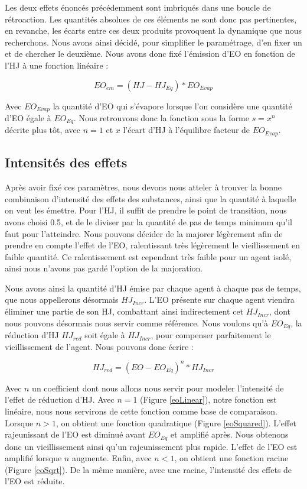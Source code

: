 	Les deux effets énoncés précédemment sont imbriqués dans une boucle de rétroaction. Les quantités absolues de ces éléments ne sont donc pas pertinentes, en revanche, les écarts entre ces deux produits provoquent la dynamique que nous recherchons. Nous avons ainsi décidé, pour simplifier le paramétrage, d'en fixer un et de chercher le deuxième. Nous avons donc fixé l'émission d'EO en fonction de l'HJ à une fonction linéaire :
	
	\begin{equation}
		EO_{em} = (HJ - HJ_{Eq}) * EO_{Evap}
	\label{eoEM}
	\end{equation}

Avec $EO_{Evap}$ la quantité d'EO qui s'évapore lorsque l'on considère une quantité d'EO égale à $EO_{Eq}$. Nous retrouvons donc la fonction sous la forme $s=x^n$ décrite plus tôt, avec $n = 1$ et $x$ l'écart d'HJ à l'équilibre facteur de $EO_{Evap}$.
	
	
	\subsection{Intensités des effets}	
	Après avoir fixé ces paramètres, nous devons nous atteler à trouver la bonne combinaison d'intensité des effets des substances, ainsi que la quantité à laquelle on veut les émettre. Pour l'HJ, il suffit de prendre le point de transition, nous avons choisi 0.5, et de le diviser par la quantité de pas de temps minimum qu'il faut pour l'atteindre. Nous pouvons décider de la majorer légèrement afin de prendre en compte l'effet de l'EO, ralentissant très légèrement le vieillissement en faible quantité. Ce ralentissement est cependant très faible pour un agent isolé, ainsi nous n'avons pas gardé l'option de la majoration.
	
	Nous avons ainsi la quantité d'HJ émise par chaque agent à chaque pas de temps, que nous appellerons désormais $HJ_{Incr}$. L'EO présente sur chaque agent viendra éliminer une partie de son HJ, combattant ainsi indirectement cet $HJ_{Incr}$, dont nous pouvons désormais nous servir comme référence. Nous voulons qu'à $EO_{Eq}$, la réduction d'HJ $HJ_{red}$ soit égale à $HJ_{Incr}$, pour compenser parfaitement le vieillissement de l'agent. Nous pouvons donc écrire :
	
	\begin{equation}
		 HJ_{red} = (EO - EO_{Eq})^n * HJ_{Incr}
	\label{hjRED}
	\end{equation}
	
	Avec $n$ un coefficient dont nous allons nous servir pour modeler l'intensité de l'effet de réduction d'HJ. Avec $n=1$ (Figure \ref{eoLinear}), notre fonction est linéaire, nous nous servirons de cette fonction comme base de comparaison. Lorsque $n>1$, on obtient une fonction quadratique (Figure \ref{eoSquared}). L'effet rajeunissant de l'EO est diminué avant $EO_{Eq}$ et amplifié après. Nous obtenons donc un vieillissement ainsi qu'un rajeunissement plus rapide. L'effet de l'EO est amplifié lorsque $n$ augmente. Enfin, avec $n < 1$, on obtient une fonction racine (Figure \ref{eoSqrt}). De la même manière, avec une racine, l'intensité des effets de l'EO est réduite.
	
